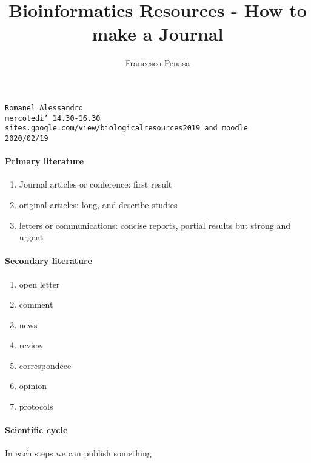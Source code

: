 \documentclass[11pt]{article}
\begin{document}
\author{Francesco Penasa}
\title{Bioinformatics Resources - How to make a Journal}
\maketitle

\medskip

\texttt{Romanel Alessandro}\\
\texttt{mercoledi' 14.30-16.30}\\
\texttt{sites.google.com/view/biologicalresources2019 and moodle}\\ 
\texttt{2020/02/19}\\
\paragraph{Primary literature} %
\label{par:primary_literature}
\begin{enumerate}
	\item Journal articles or conference: first result
	\item original articles: long, and describe studies
	\item letters or communications: concise reports, partial results but strong and urgent 
\end{enumerate}


\paragraph{Secondary literature} %
\label{par:secondary_literature}
\begin{enumerate}
	\item open letter
	\item comment 
	\item news
	\item review
	\item correspondece
	\item opinion
	\item protocols
\end{enumerate}

\paragraph{Scientific cycle} %
\label{par:scientific_cycle}
In each steps we can publish something
\end{document}
